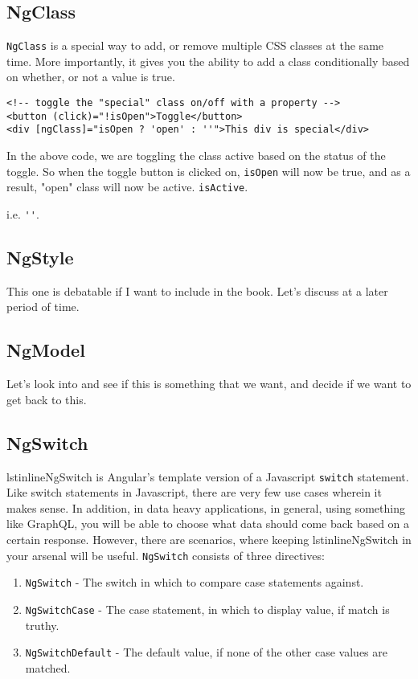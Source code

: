 \subsection{NgClass}
\lstinline{NgClass} is a special way to add, or remove multiple CSS classes 
at the same time. More importantly, it gives you the ability to add a class 
conditionally based on whether, or not a value is true. 
\begin{lstlisting}
<!-- toggle the "special" class on/off with a property -->
<button (click)="!isOpen">Toggle</button>
<div [ngClass]="isOpen ? 'open' : ''">This div is special</div>
\end{lstlisting}

In the above code, we are toggling the class active based on the status of 
the toggle. So when the toggle button is clicked on, \lstinline{isOpen} will 
now be true, and as a result, "open" class will now be active. 
\lstinline{isActive}. 

 i.e. \lstinline{''}. 

 \subsection{ NgStyle }
This one is debatable if I want to include in the book. Let's discuss at a
later period of time. 

\subsection{ NgModel }
Let's look into and see if this is something that we want, and decide if we 
want to get back to this. 

\subsection{ NgSwitch }
lstinline{NgSwitch} is Angular's template version of a Javascript 
\lstinline{switch} statement. Like switch statements in Javascript, there are 
very few use cases wherein it makes sense. In addition, in data heavy 
applications, in general, using something like GraphQL, you will be able to 
choose what data should come back based on a certain response. However, there 
are scenarios, where keeping lstinline{NgSwitch} in your arsenal will be 
useful. \lstinline{NgSwitch} consists of three directives: 
\begin{enumerate}
  \item \lstinline{NgSwitch} - The switch in which to compare case statements against. 
  \item \lstinline{NgSwitchCase} - The case statement, in which to display 
  value, if match is truthy. 
  \item \lstinline{NgSwitchDefault} - The default value, if none of the other
  case values are matched. 
\end{enumerate}

